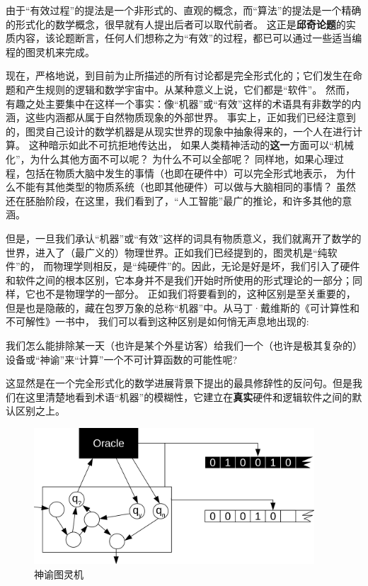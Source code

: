 \documentclass[a4paper,12pt]{article}
\begin{document}
由于“有效过程”的提法是一个非形式的、直观的概念，而“算法”的提法是一个精确的形式化的数学概念，很早就有人提出后者可以取代前者。
这正是\textbf{\gls{邱奇论题}}的实质内容\cite{KleeneSC1952}，该论题断言，任何人们想称之为“有效”的过程，都已可以通过一些适当编程的图灵机来完成。

现在，严格地说，到目前为止所描述的所有讨论都是完全形式化的；它们发生在\gls{命题}和\gls{产生规则}的逻辑和数学宇宙中。从某种意义上说，它们都是“\gls{软件}”。
然而，有趣之处主要集中在这样一个事实：像“机器”或“有效”这样的术语具有非数学的内涵，这些内涵都从属于自然\gls{物质现象}的外部世界。
事实上，正如我们已经注意到的，图灵自己设计的数学机器是从现实世界的现象中抽象得来的，一个人在进行计算。
这种暗示如此不可抗拒地传达出， 如果人类精神活动的\textbf{这一}方面可以“机械化”，为什么其他方面不可以呢？ 为什么不可以全部呢？
同样地，如果心理过程，包括在物质大脑中发生的事情（也即在\gls{硬件}中）可以完全形式地表示，
为什么不能有其他类型的\gls{物质系统}（也即其他硬件）可以做与大脑相同的事情？
虽然还在胚胎阶段，在这里，我们看到了，“\gls{人工智能}”最广的推论，和许多其他的意涵。

但是，一旦我们承认“机器”或“有效”这样的词具有物质意义，我们就离开了数学的世界，进入了（最广义的）物理世界。正如我们已经提到的，图灵机是“纯软件”的，
而物理学则相反，是“纯硬件”的。因此，无论是好是坏，我们引入了硬件和软件之间的根本区别，它本身并不是我们开始时所使用的\gls{形式理论}的一部分；同样，它也不是物理学的一部分。
正如我们将要看到的，这种区别是至关重要的，但是也是隐蔽的，藏在包罗万象的总称“机器”中。从马丁·戴维斯的《可计算性和不可解性》\cite{DavisM1958}一书中，
我们可以看到这种区别是如何悄无声息地出现的:

\begin{displayquote}
    我们怎么能排除某一天（也许是某个外星访客）给我们一个（也许是极其复杂的）设备或“\gls{神谕}”来“计算”一个\gls{不可计算}函数的可能性呢?
\end{displayquote}

这显然是在一个完全形式化的数学进展背景下提出的最具修辞性的反问句。但是我们在这里清楚地看到术语“机器”的模糊性，它建立在\textbf{真实}硬件和逻辑软件之间的默认区别之上。

\begin{figure}[ht]
\centering
\includegraphics[height=2.0in]{images/turing_machine_oracle.png}
\caption{神谕图灵机}
\end{figure}
\end{document}
